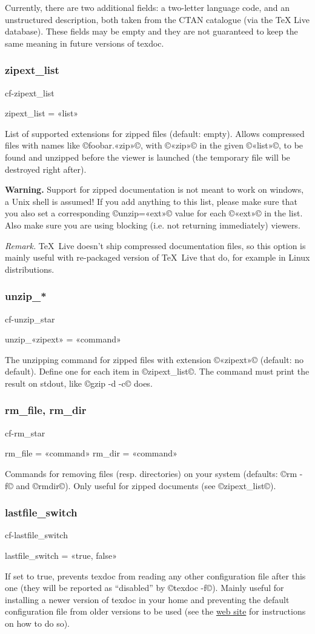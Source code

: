 \documentclass[a4paper, oneside]{scrartcl}
\newif\ifframed
\newenvironment{cmdsubsub}[2]{%
  \framedfalse \commandes\subsubsection{#1}{#2}%
  }{%
  \endcommandes}
\newcommand\texdoc{texdoc\xspace}
\begin{document}
Currently, there are two additional fields: a two-letter language code, and
an unstructured description, both taken from the CTAN catalogue (via the TeX
Live database). These fields may be empty and they are not guaranteed to keep
the same meaning in future versions of \texdoc.

\begin{cmdsubsub}{zipext_list}{cf-zipext_list}
  zipext_list = «list»
\end{cmdsubsub}

List of supported extensions for zipped files (default: empty).  Allows
compressed files with names like ©foobar.«zip»©, with ©«zip»© in the given
©«list»©, to be found and unzipped before the viewer is launched (the
temporary file will be destroyed right after).

\textbf{Warning.} Support for zipped documentation is not meant to work on
windows, a Unix shell is assumed! If you add anything to this list, please
make sure that you also set a corresponding ©unzip=«ext»© value for each
©«ext»© in the list. Also make sure you are using blocking (i.e. not returning
immediately) viewers.

\textit{Remark.} \TeX\ Live doesn't ship compressed documentation files, so
this option is mainly useful with re-packaged version of \TeX\ Live that do,
for example in Linux distributions.

\begin{cmdsubsub}{unzip_*}{cf-unzip_star}
  unzip_«zipext» = «command»
\end{cmdsubsub}

The unzipping command for zipped files with extension ©«zipext»© (default: no
default). Define one for each item in ©zipext_list©. The command must print
the result on stdout, like ©gzip -d -c© does.

\begin{cmdsubsub}{rm_file, rm_dir}{cf-rm_star}
  rm_file = «command»
  rm_dir  = «command»
\end{cmdsubsub}

Commands for removing files (resp. directories) on your system (defaults:
©rm -f© and ©rmdir©). Only useful for zipped documents (see ©zipext_list©).

\begin{cmdsubsub}{lastfile_switch}{cf-lastfile_switch}
  lastfile_switch = «true, false»
\end{cmdsubsub}

If set to true, prevents \texdoc from reading any other configuration file
after this one (they will be reported as ``disabled'' by ©texdoc -f©).  Mainly
useful for installing a newer version of \texdoc in your home and preventing
the default configuration file from older versions to be used (see the
\href{http://tug.org/texdoc/}{web site} for instructions on how to do so).
\end{document}
